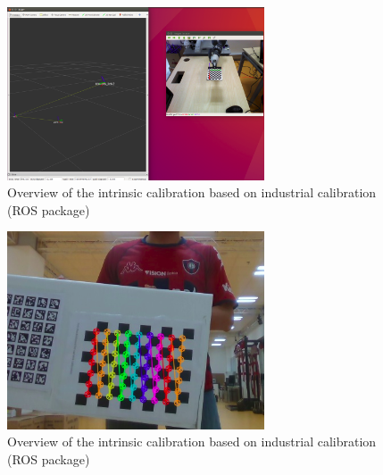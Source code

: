 \begin{figure}[!h]
\begin{center}
\includegraphics[width=3in]{figures03/rviz1.png}
\caption{Overview of the intrinsic calibration based on industrial calibration (ROS package)}%
\label{fig:rosCAL}
\end{center}
\end{figure}

\begin{figure}[!h]
\begin{center}
\includegraphics[width=3in]{figures03/openCV1.png}
\caption{Overview of the intrinsic calibration based on industrial calibration (ROS package)}%
\label{fig:rosCAL}
\end{center}
\end{figure}









